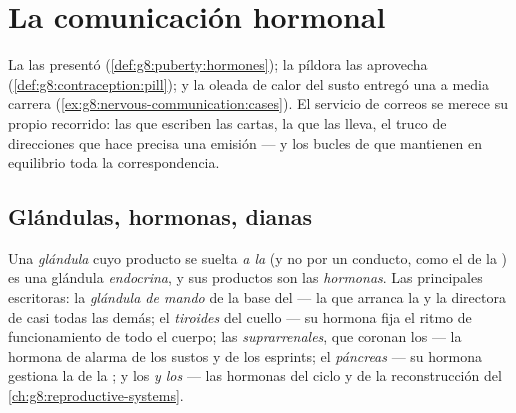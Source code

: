 \chapter{La comunicación hormonal}\label{ch:g8:hormonal-communication}

La  las presentó (\cref{def:g8:puberty:hormones}); la píldora
las aprovecha (\cref{def:g8:contraception:pill}); y la oleada de calor
del susto entregó una a media carrera
(\cref{ex:g8:nervous-communication:cases}). El servicio de correos se
merece su propio recorrido: las  que escriben las cartas, la
 que las lleva, el truco de direcciones que hace precisa una
emisión --- y los bucles de  que mantienen en
equilibrio toda la correspondencia.

\section{Glándulas, hormonas, dianas}

\begin{definition}\label{def:g8:hormonal-communication:glands}
Una \emph{glándula} cuyo producto se suelta \emph{a la
} (y no por un conducto, como el de la ) es una glándula
\emph{endocrina}, y sus productos son las
\emph{hormonas}. Las principales escritoras: la
\emph{glándula de mando} de la base del  --- la que arranca la
 y la directora de casi todas las demás; el \emph{tiroides} del
cuello --- su hormona fija el ritmo de funcionamiento de todo el
cuerpo; las \emph{suprarrenales}, que coronan los  --- la
hormona de alarma de los sustos y de los esprints; el
\emph{páncreas} --- su hormona gestiona la  de la ; y los
\emph{ y los } --- las hormonas del ciclo y de la
reconstrucción del \cref{ch:g8:reproductive-systems}.
\end{definition}

